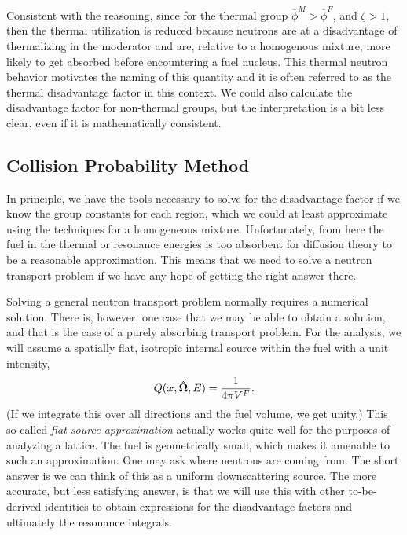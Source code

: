 Consistent with the reasoning, since for the thermal group $\overline{\phi}^M > \overline{\phi}^F$, and $\zeta > 1$, then the thermal utilization is reduced because neutrons are at a disadvantage of thermalizing in the moderator and are, relative to a homogenous mixture, more likely to get absorbed before encountering a fuel nucleus. This thermal neutron behavior motivates the naming of this quantity and it is often referred to as the thermal disadvantage factor in this context. We could also calculate the disadvantage factor for non-thermal groups, but the interpretation is a bit less clear, even if it is mathematically consistent.


\subsection{Collision Probability Method} \label{Sec:thermalization_collisionProbabilityMethod}

In principle, we have the tools necessary to solve for the disadvantage factor if we know the group constants for each region, which we could at least approximate using the techniques for a homogeneous mixture. Unfortunately, from here the fuel in the thermal or resonance energies is too absorbent for diffusion theory to be a reasonable approximation. This means that we need to solve a neutron transport problem if we have any hope of getting the right answer there.

Solving a general neutron transport problem normally requires a numerical solution. There is, however, one case that we may be able to obtain a solution, and that is the case of a purely absorbing transport problem. For the analysis, we will assume a spatially flat, isotropic internal source within the fuel with a unit intensity,
\begin{align}
   Q(\bm{x},\hat{\mathbf{\Omega}},E) = \frac{1}{4\pi V^F}.
\end{align}
(If we integrate this over all directions and the fuel volume, we get unity.) This so-called \emph{flat source approximation} actually works quite well for the purposes of analyzing a lattice. The fuel is geometrically small, which makes it amenable to such an approximation. One may ask where neutrons are coming from. The short answer is we can think of this as a uniform downscattering source. The more accurate, but less satisfying answer, is that we will use this with other to-be-derived identities to obtain expressions for the disadvantage factors and ultimately the resonance integrals.

